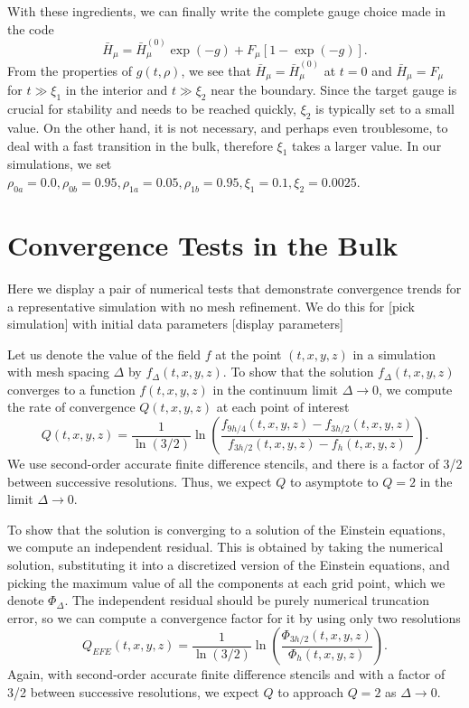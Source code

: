 \documentclass[a4paper,11pt]{article}
\begin{document}
With these ingredients, we can finally write the complete gauge choice made in the code
\begin{equation}
\bar{H}_\mu=\bar{H}_{\mu}^{(0)}\exp(-g)+F_\mu[1- \exp(-g)].
\end{equation}
From the properties of $g(t,\rho)$, we see that $\bar{H}_\mu=\bar{H}_{\mu}^{(0)}$ at $t=0$ and $\bar{H}_\mu=F_\mu$ for $t\gg\xi_1$ in the interior and $t\gg\xi_2$ near the boundary. Since the target gauge is crucial for stability and needs to be reached quickly, $\xi_2$ is typically set to a small value. On the other hand, it is not necessary, and perhaps even troublesome, to deal with a fast transition in the bulk, therefore $\xi_1$ takes a larger value. In our simulations, we set $\rho_{0a}=0.0,\rho_{0b}=0.95,\rho_{1a}=0.05,\rho_{1b}=0.95,\xi_1=0.1,\xi_2=0.0025$.

\section{Convergence Tests in the Bulk}\label{sec:convbulk}

Here we display a pair of numerical tests that demonstrate convergence trends for a representative simulation with no mesh refinement.
We do this for [pick simulation] with initial data parameters [display parameters]

Let us denote the value of the field $f$ at the point $(t,x,y,z)$ in a simulation with mesh spacing $\Delta$ by $f_\Delta(t,x,y,z)$.
To show that the solution $f_\Delta(t,x,y,z)$ converges to a function $f(t,x,y,z)$ in the continuum limit $\Delta\rightarrow0$, we compute the rate of convergence $Q(t,x,y,z)$ at each point of interest
\begin{equation}\label{eq:qconv}
Q(t,x,y,z)=\frac{1}{\ln(3/2)}\ln\left( \frac{f_{9h/4}(t,x,y,z)-f_{3h/2}(t,x,y,z)}{f_{3h/2}(t,x,y,z)-f_{h}(t,x,y,z)} \right).
\end{equation}
We use second-order accurate finite difference stencils, and there is a factor of 3/2 between successive resolutions.
Thus, we expect $Q$ to asymptote to $Q=2$ in the limit $\Delta\rightarrow0$.

To show that the solution is converging to a solution of the Einstein equations, we compute an independent residual. 
This is obtained by taking the numerical solution, substituting it into a discretized version of
the Einstein equations, and picking the maximum value of all the components at each grid point, which we denote $\Phi_\Delta$. 
The independent residual should be purely numerical truncation error, so we can compute a convergence factor for it by using only two resolutions
\begin{equation}\label{eq:qires}
Q_{EFE}(t,x,y,z)=\frac{1}{\ln(3/2)}\ln\left( \frac{\Phi_{3h/2}(t,x,y,z)}{\Phi_{h}(t,x,y,z)} \right).
\end{equation}
Again, with second-order accurate finite difference stencils and with a factor of 3/2 between successive resolutions, we expect $Q$ to approach $Q=2$ as $\Delta\rightarrow0$.
\end{document}
